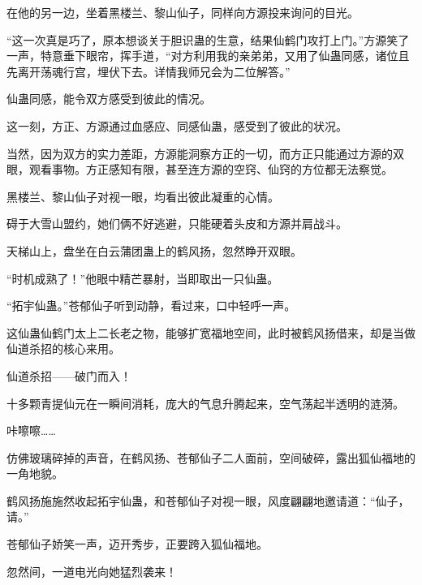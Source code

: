 \begin{this_body}
在他的另一边，坐着黑楼兰、黎山仙子，同样向方源投来询问的目光。

“这一次真是巧了，原本想谈关于胆识蛊的生意，结果仙鹤门攻打上门。”方源笑了一声，特意垂下眼帘，挥手道，“对方利用我的亲弟弟，又用了仙蛊同感，诸位且先离开荡魂行宫，埋伏下去。详情我师兄会为二位解答。”

仙蛊同感，能令双方感受到彼此的情况。

这一刻，方正、方源通过血感应、同感仙蛊，感受到了彼此的状况。

当然，因为双方的实力差距，方源能洞察方正的一切，而方正只能通过方源的双眼，观看事物。方正感知有限，甚至连方源的空窍、仙窍的方位都无法察觉。

黑楼兰、黎山仙子对视一眼，均看出彼此凝重的心情。

碍于大雪山盟约，她们俩不好逃避，只能硬着头皮和方源并肩战斗。

天梯山上，盘坐在白云蒲团蛊上的鹤风扬，忽然睁开双眼。

“时机成熟了！”他眼中精芒暴射，当即取出一只仙蛊。

“拓宇仙蛊。”苍郁仙子听到动静，看过来，口中轻呼一声。

这仙蛊仙鹤门太上二长老之物，能够扩宽福地空间，此时被鹤风扬借来，却是当做仙道杀招的核心来用。

仙道杀招——破门而入！

十多颗青提仙元在一瞬间消耗，庞大的气息升腾起来，空气荡起半透明的涟漪。

咔嚓嚓……

仿佛玻璃碎掉的声音，在鹤风扬、苍郁仙子二人面前，空间破碎，露出狐仙福地的一角地貌。

鹤风扬施施然收起拓宇仙蛊，和苍郁仙子对视一眼，风度翩翩地邀请道：“仙子，请。”

苍郁仙子娇笑一声，迈开秀步，正要跨入狐仙福地。

忽然间，一道电光向她猛烈袭来！

\end{this_body}

